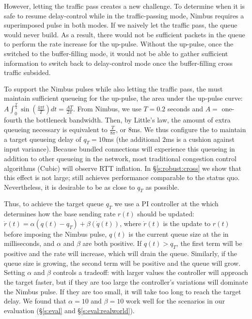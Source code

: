 However, letting the traffic pass creates a new challenge. 
To determine when it is safe to resume delay-control while in the traffic-passing mode, Nimbus requires a superimposed pulse in both modes. If we naively let the traffic pass, the \inbox queue would never build. As a result, there would not be sufficient packets in the queue to perform the rate increase for the up-pulse. 
Without the up-pulse, once the \inbox{} switched to the buffer-filling mode, it would not be able to gather sufficient information to switch back to delay-control mode once the buffer-filling cross traffic subsided.

To support the Nimbus pulses while also letting the traffic pass,
the \inbox must maintain sufficient queueing for the up-pulse,
\ie the area under the up-pulse curve: 
$A \int_0^{\frac{T}{4}} \sin(\frac{4\pi{}t}{T}) dt = \frac{AT}{2\pi}$.
From Nimbus, we use $T = 0.2$ seconds and $A =$ one-fourth the bottleneck bandwidth. Then, by Little's law, the amount of extra queueing necessary is equivalent to
$\frac{T}{8\pi}$, or $8$ms. 
We thus configure the \inbox to maintain a target queueing delay of $q_T = 10$ms (the additional $2$ms is a cushion against input variance).
Because bundled connections will experience this queueing in addition to other queueing in the network, 
most traditional congestion control algorithms (\eg Cubic) will observe RTT inflation. 
In \S\ref{s:robust:cross} we show that this effect is not large; \name still achieves performance comparable to the status quo. Nevertheless, it is desirable to be as close to $q_T$ as possible. 

Thus, to achieve the target queue $q_T$
we use a PI controller at the \inbox which determines how the base sending rate $r(t)$ should be updated:
$\dot{r}(t) = \alpha (q(t) - q_T) + \beta (\dot{q}(t))$, where $\dot{r}(t)$ is the update to $r(t)$ before imposing the Nimbus pulse, $q(t)$ is the current queue size at the \inbox in milliseconds, and $\alpha$ and $\beta$ are both positive.
If $q(t) > q_T$, the first term will be positive and the rate will increase, which will drain the queue. Similarly, if the queue size is growing, the second term will be positive and the queue will grow. 
Setting $\alpha$ and $\beta$ controls a tradeoff: with larger values the controller will approach the target faster, but if they are too large the controller's variations will dominate the Nimbus pulse. 
If they are too small, it will take too long to reach the target delay. 
We found that $\alpha=10$ and $\beta = 10$ work well for the scenarios in our evaluation (\S\ref{s:eval} and \S\ref{s:eval:realworld}).


